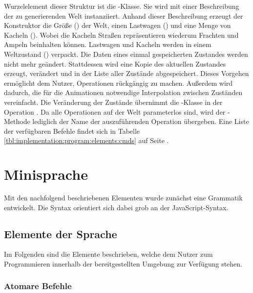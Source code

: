 Wurzelelement dieser Struktur ist die -Klasse. Sie wird mit einer Beschreibung der zu generierenden Welt instanziiert. Anhand dieser Beschreibung erzeugt der Konstruktor die Größe () der Welt, einen Lastwagen () und eine Menge von Kacheln (). Wobei die Kacheln Straßen repräsentieren wiederum Frachten und Ampeln beinhalten können. Lastwagen und Kacheln werden in einem Weltzustand () verpackt. Die Daten eines einmal gespeicherten Zustandes werden nicht mehr geändert. Stattdessen wird eine Kopie des aktuellen Zustandes erzeugt, verändert und in der Liste aller Zustände abgespeichert. Dieses Vorgehen ermöglicht dem Nutzer, Operationen rückgängig zu machen. Außerdem wird dadurch, die für die Animationen  notwendige Interpolation zwischen Zuständen vereinfacht. Die Veränderung der Zustände übernimmt die -Klasse in der Operation . Da alle Operationen auf der Welt parameterlos sind, wird der -Methode lediglich der Name der auszuführenden Operation übergeben. Eine Liste der verfügbaren Befehle findet sich in Tabelle \ref{tbl:implementation:program:elements:cmds} auf Seite \pageref{tbl:implementation:program:elements:cmds}.

\section{Minisprache}
\label{sec:implementation:program}

Mit den nachfolgend beschriebenen Elementen wurde zunächst eine Grammatik entwickelt. Die Syntax orientiert sich dabei grob an der JavaScript-Syntax.

\subsection{Elemente der Sprache}
\label{sec:implementation:program:elements}

Im Folgenden sind die Elemente beschrieben, welche dem Nutzer zum Programmieren innerhalb der bereitgestellten Umgebung zur Verfügung stehen.

\subsubsection{Atomare Befehle}
\label{sec:implementation:program:elements:cmds}

